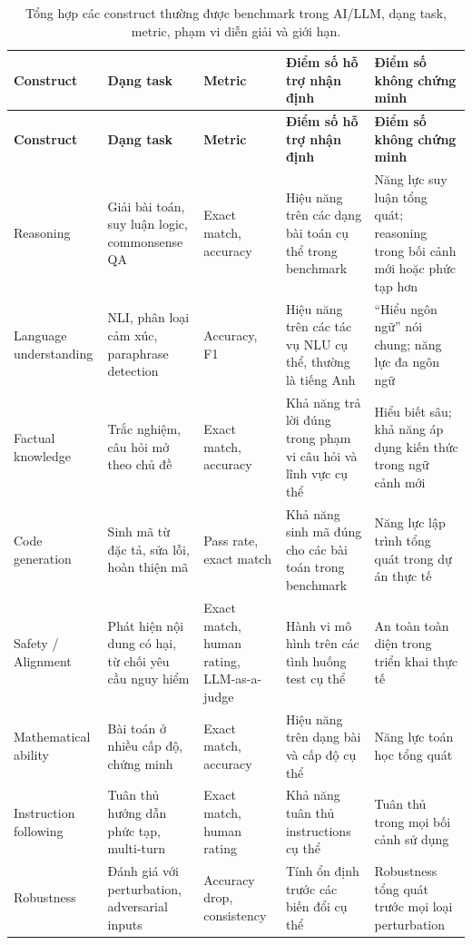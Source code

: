 \begin{longtable}{
    P{2.4cm}
    P{3cm}
    P{2.4cm}
    P{3.6cm}
    P{4cm}
}
\caption{Tổng hợp các construct thường được benchmark trong AI/LLM, dạng task, metric, phạm vi diễn giải và giới hạn.}
\label{tab:whats_measured} \\

\toprule
\textbf{Construct} &
\textbf{Dạng task} &
\textbf{Metric} &
\textbf{Điểm số hỗ trợ nhận định} &
\textbf{Điểm số không chứng minh} \\
\midrule
\endfirsthead

\toprule
\textbf{Construct} &
\textbf{Dạng task} &
\textbf{Metric} &
\textbf{Điểm số hỗ trợ nhận định} &
\textbf{Điểm số không chứng minh} \\
\midrule
\endhead

Reasoning &
Giải bài toán, suy luận logic, commonsense QA &
Exact match, accuracy &
Hiệu năng trên các dạng bài toán cụ thể trong benchmark &
Năng lực suy luận tổng quát; reasoning trong bối cảnh mới hoặc phức tạp hơn \\

\addlinespace[2pt]
Language understanding &
NLI, phân loại cảm xúc, paraphrase detection &
Accuracy, F1 &
Hiệu năng trên các tác vụ NLU cụ thể, thường là tiếng Anh &
``Hiểu ngôn ngữ'' nói chung; năng lực đa ngôn ngữ \\

\addlinespace[2pt]
Factual knowledge &
Trắc nghiệm, câu hỏi mở theo chủ đề &
Exact match, accuracy &
Khả năng trả lời đúng trong phạm vi câu hỏi và lĩnh vực cụ thể &
Hiểu biết sâu; khả năng áp dụng kiến thức trong ngữ cảnh mới \\

\addlinespace[2pt]
Code generation &
Sinh mã từ đặc tả, sửa lỗi, hoàn thiện mã &
Pass rate, exact match &
Khả năng sinh mã đúng cho các bài toán trong benchmark &
Năng lực lập trình tổng quát trong dự án thực tế \\

\addlinespace[2pt]
Safety / Alignment &
Phát hiện nội dung có hại, từ chối yêu cầu nguy hiểm &
Exact match, human rating, LLM-as-a-judge &
Hành vi mô hình trên các tình huống test cụ thể &
An toàn toàn diện trong triển khai thực tế \\

\addlinespace[2pt]
Mathematical ability &
Bài toán ở nhiều cấp độ, chứng minh &
Exact match, accuracy &
Hiệu năng trên dạng bài và cấp độ cụ thể &
Năng lực toán học tổng quát \\

\addlinespace[2pt]
Instruction following &
Tuân thủ hướng dẫn phức tạp, multi-turn &
Exact match, human rating &
Khả năng tuân thủ instructions cụ thể &
Tuân thủ trong mọi bối cảnh sử dụng \\

\addlinespace[2pt]
Robustness &
Đánh giá với perturbation, adversarial inputs &
Accuracy drop, consistency &
Tính ổn định trước các biến đổi cụ thể &
Robustness tổng quát trước mọi loại perturbation \\

\bottomrule
\end{longtable}

